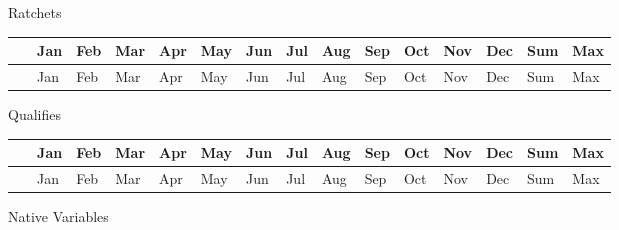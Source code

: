 Ratchets

\begin{longtable}[c]{@{}lllllllllllllll@{}}
\toprule
~ & Jan & Feb & Mar & Apr & May & Jun & Jul & Aug & Sep & Oct & Nov & Dec & Sum & Max \tabularnewline
\midrule
\endfirsthead

\toprule
~ & Jan & Feb & Mar & Apr & May & Jun & Jul & Aug & Sep & Oct & Nov & Dec & Sum & Max \tabularnewline
\midrule
\endhead

\bottomrule
\end{longtable}

Qualifies

\begin{longtable}[c]{@{}lllllllllllllll@{}}
\toprule
~ & Jan & Feb & Mar & Apr & May & Jun & Jul & Aug & Sep & Oct & Nov & Dec & Sum & Max \tabularnewline
\midrule
\endfirsthead

\toprule
~ & Jan & Feb & Mar & Apr & May & Jun & Jul & Aug & Sep & Oct & Nov & Dec & Sum & Max \tabularnewline
\midrule
\endhead

\bottomrule
\end{longtable}

Native Variables

